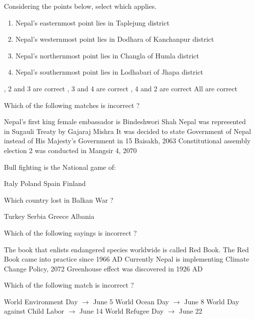 \begin{questions}
\question Considering the points below, select which applies.
  \begin{enumerate}
  \item Nepal's easternmost point lies in Taplejung district
  \item Nepal's westernmost point lies in Dodhara of Kanchanpur district
  \item Nepal's northernmost point lies in Changla of Humla district
  \item Nepal's southernmost point lies in Lodhabari of Jhapa district
  \end{enumerate}

  \begin{choices}
  , 2 and 3 are correct
  , 3 and 4 are correct
  , 4 and 2 are correct
  \CorrectChoice All are correct
  \end{choices}

\question Which of the following matches is incorrect ?
  \begin{choices}
  \CorrectChoice Nepal's first king female embassador is Bindeshwori Shah
  \choice Nepal was represented in Sugauli Treaty by Gajaraj Mishra
  \choice It was decided to state Government of Nepal instead of His Majesty's Government in 15 Baisakh, 2063
  \choice Constitutional assembly election 2 was conducted in Mangsir 4, 2070
  \end{choices}

\question Bull fighting is the National game of:
  \begin{choices}
  \choice Italy
  \choice Poland
  \CorrectChoice Spain
  \choice Finland
  \end{choices}

\question Which country lost in Balkan War ?
  \begin{choices}
  \CorrectChoice Turkey
  \choice Serbia
  \choice Greece
  \choice Albania
  \end{choices}

\question Which of the following sayings is incorrect ?
  \begin{choices}
  \choice The book that enlists endangered species worldwide is called Red Book.
  \choice The Red Book came into practice since 1966 AD
  \CorrectChoice Currently Nepal is implementing Climate Change Policy, 2072
  \choice Greenhouse effect was discovered in 1926 AD
  \end{choices}

\question Which of the following match is incorrect ?
  \begin{choices}
  \choice World Environment Day $\longrightarrow$ June 5
  \choice World Ocean Day $\longrightarrow$ June 8
  \choice World Day against Child Labor $\longrightarrow$ June 14
  \CorrectChoice World Refugee Day $\longrightarrow$ June 22
  \end{choices}


\end{questions}
